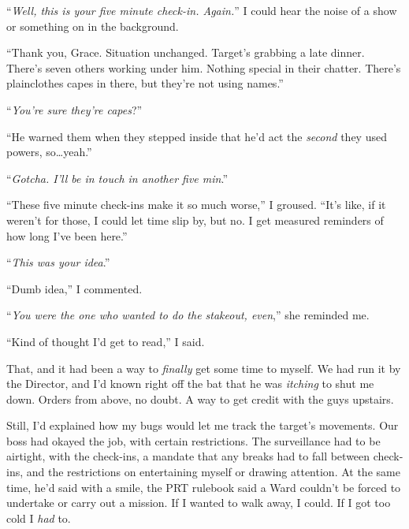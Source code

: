 ``\emph{Well, this is your five minute check-in.  Again.}''  I could hear the noise of a show or something on in the background.



``Thank you, Grace.  Situation unchanged.  Target's grabbing a late dinner.  There's seven others working under him.  Nothing special in their chatter.  There's plainclothes capes in there, but they're not using names.''



``\emph{You're sure they're capes}?''



``He warned them when they stepped inside that he'd act the \emph{second} they used powers, so\ldots yeah.''



``\emph{Gotcha.  I'll be in touch in another five min}.''



``These five minute check-ins make it so much worse,'' I groused.  ``It's like, if it weren't for those, I could let time slip by, but no.  I get measured reminders of how long I've been here.''



``\emph{This was your idea}.''



``Dumb idea,'' I commented.



``\emph{You were the one who wanted to do the stakeout, even},'' she reminded me.



``Kind of thought I'd get to read,'' I said.



That, and it had been a way to \emph{finally} get some time to myself.  We had run it by the Director, and I'd known right off the bat that he was \emph{itching} to shut me down.  Orders from above, no doubt.  A way to get credit with the guys upstairs.



Still, I'd explained how my bugs would let me track the target's movements.  Our boss had okayed the job, with certain restrictions.  The surveillance had to be airtight, with the check-ins, a mandate that any breaks had to fall between check-ins, and the restrictions on entertaining myself or drawing attention.  At the same time, he'd said with a smile, the PRT rulebook said a Ward couldn't be forced to undertake or carry out a mission.  If I wanted to walk away, I could.  If I got too cold I \emph{had} to.



